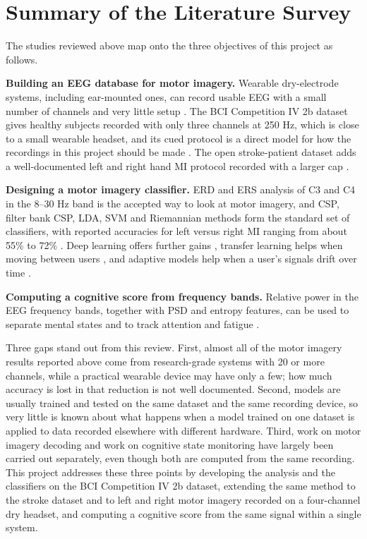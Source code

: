 \section{Summary of the Literature Survey}

The studies reviewed above map onto the three objectives of this project as follows.

\textbf{Building an EEG database for motor imagery.} Wearable dry-electrode systems,
including ear-mounted ones, can record usable EEG with a small number of channels and very
little setup \cite{mullen2015wearable, kappel2019earEEG}. The BCI Competition IV 2b
dataset gives healthy subjects recorded with only three channels at 250 Hz, which is close
to a small wearable headset, and its cued protocol is a direct model for how the recordings
in this project should be made \cite{leeb2007virtual}. The open stroke-patient dataset
adds a well-documented left and right hand MI protocol recorded with a larger
cap \cite{liu2024mi}.

\textbf{Designing a motor imagery classifier.} ERD and ERS analysis of C3 and C4 in the
8--30 Hz band is the accepted way to look at motor imagery, and CSP, filter bank CSP,
LDA, SVM and Riemannian methods form the standard set of classifiers, with reported
accuracies for left versus right MI ranging from about 55\% to 72\%
\cite{liu2024mi}. Deep learning offers further gains \cite{xu2023review,
song2023conformer}, transfer learning helps when moving between users
\cite{jerrin2021imagined}, and adaptive models help when a user's signals drift over time
\cite{su2024hybrid}.

\textbf{Computing a cognitive score from frequency bands.} Relative power in the EEG
frequency bands, together with PSD and entropy features, can be used to separate mental
states and to track attention and fatigue \cite{bird2018mental, jawed2024visual,
ming2021drowsiness, jiri2025drowsiness}.

Three gaps stand out from this review. First, almost all of the motor imagery results
reported above come from research-grade systems with 20 or more channels, while a practical
wearable device may have only a few; how much accuracy is lost in that reduction is not
well documented. Second, models are usually trained and tested on the same dataset and the
same recording device, so very little is known about what happens when a model trained on
one dataset is applied to data recorded elsewhere with different hardware. Third, work on
motor imagery decoding and work on cognitive state monitoring have largely been carried out
separately, even though both are computed from the same recording. This project addresses
these three points by developing the analysis and the classifiers on the BCI Competition
IV 2b dataset, extending the same method to the stroke dataset and to left and right motor
imagery recorded on a four-channel dry headset, and computing a cognitive score from the
same signal within a single system.